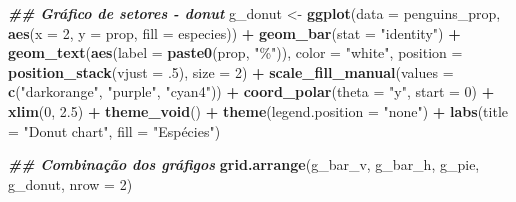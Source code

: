 \documentclass[
]{article}
\newenvironment{Shaded}{\begin{snugshade}}{\end{snugshade}}
\newcommand{\AttributeTok}[1]{\textcolor[rgb]{0.13,0.29,0.53}{#1}}
\newcommand{\DecValTok}[1]{\textcolor[rgb]{0.00,0.00,0.81}{#1}}
\newcommand{\DocumentationTok}[1]{\textcolor[rgb]{0.56,0.35,0.01}{\textbf{\textit{#1}}}}
\newcommand{\FloatTok}[1]{\textcolor[rgb]{0.00,0.00,0.81}{#1}}
\newcommand{\FunctionTok}[1]{\textcolor[rgb]{0.13,0.29,0.53}{\textbf{#1}}}
\newcommand{\NormalTok}[1]{#1}
\newcommand{\OtherTok}[1]{\textcolor[rgb]{0.56,0.35,0.01}{#1}}
\newcommand{\SpecialCharTok}[1]{\textcolor[rgb]{0.81,0.36,0.00}{\textbf{#1}}}
\newcommand{\StringTok}[1]{\textcolor[rgb]{0.31,0.60,0.02}{#1}}
\begin{document}
\begin{Shaded}
\begin{Highlighting}[]
\DocumentationTok{\#\# Gráfico de setores {-} donut}
\NormalTok{g\_donut }\OtherTok{\textless{}{-}} \FunctionTok{ggplot}\NormalTok{(}\AttributeTok{data =}\NormalTok{ penguins\_prop, }\FunctionTok{aes}\NormalTok{(}\AttributeTok{x =} \DecValTok{2}\NormalTok{, }\AttributeTok{y =}\NormalTok{ prop, }\AttributeTok{fill =}\NormalTok{ especies)) }\SpecialCharTok{+}
    \FunctionTok{geom\_bar}\NormalTok{(}\AttributeTok{stat =} \StringTok{"identity"}\NormalTok{) }\SpecialCharTok{+}
    \FunctionTok{geom\_text}\NormalTok{(}\FunctionTok{aes}\NormalTok{(}\AttributeTok{label =} \FunctionTok{paste0}\NormalTok{(prop, }\StringTok{"\%"}\NormalTok{)), }\AttributeTok{color =} \StringTok{"white"}\NormalTok{,}
              \AttributeTok{position =} \FunctionTok{position\_stack}\NormalTok{(}\AttributeTok{vjust =}\NormalTok{ .}\DecValTok{5}\NormalTok{), }\AttributeTok{size =} \DecValTok{2}\NormalTok{) }\SpecialCharTok{+}
    \FunctionTok{scale\_fill\_manual}\NormalTok{(}\AttributeTok{values =} \FunctionTok{c}\NormalTok{(}\StringTok{"darkorange"}\NormalTok{, }\StringTok{"purple"}\NormalTok{, }\StringTok{"cyan4"}\NormalTok{)) }\SpecialCharTok{+}
    \FunctionTok{coord\_polar}\NormalTok{(}\AttributeTok{theta =} \StringTok{"y"}\NormalTok{, }\AttributeTok{start =} \DecValTok{0}\NormalTok{) }\SpecialCharTok{+}
    \FunctionTok{xlim}\NormalTok{(}\DecValTok{0}\NormalTok{, }\FloatTok{2.5}\NormalTok{) }\SpecialCharTok{+}
    \FunctionTok{theme\_void}\NormalTok{() }\SpecialCharTok{+}
    \FunctionTok{theme}\NormalTok{(}\AttributeTok{legend.position =} \StringTok{"none"}\NormalTok{) }\SpecialCharTok{+}
    \FunctionTok{labs}\NormalTok{(}\AttributeTok{title =} \StringTok{"Donut chart"}\NormalTok{, }\AttributeTok{fill =} \StringTok{"Espécies"}\NormalTok{)}

\DocumentationTok{\#\# Combinação dos gráfigos}
\FunctionTok{grid.arrange}\NormalTok{(g\_bar\_v, g\_bar\_h, g\_pie, g\_donut, }\AttributeTok{nrow =} \DecValTok{2}\NormalTok{)}
\end{Highlighting}
\end{Shaded}
\end{document}
